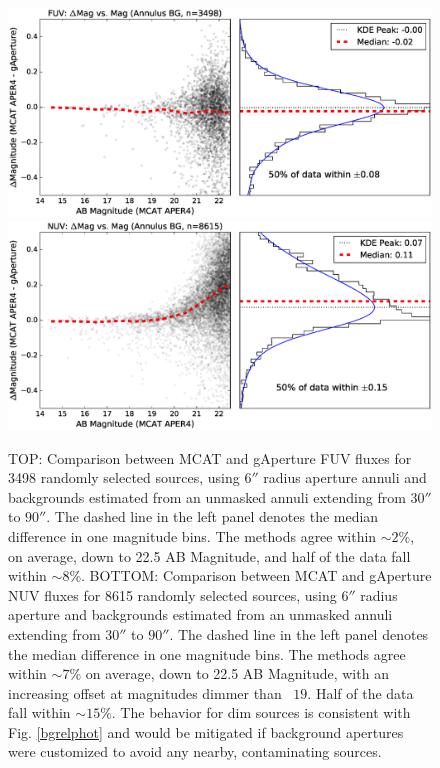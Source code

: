 \documentclass[preprint]{aastex}
\begin{document}
\begin{figure}[t!]
\begin{minipage}[c][11cm][c]{1.\textwidth}
\centering
\includegraphics[scale=0.64]{Fig05a.eps}
\includegraphics[scale=0.64]{Fig05b.eps}
\caption{TOP: Comparison between MCAT and gAperture FUV fluxes for 3498 randomly selected sources, using $6''$ radius aperture annuli and backgrounds estimated from an unmasked annuli extending from $30''$ to $90''$. The dashed line in the left panel denotes the median difference in one magnitude bins. The methods agree within $\sim 2$\%, on average, down to 22.5 AB Magnitude, and half of the data fall within $\sim 8$\%.  BOTTOM: Comparison between MCAT and gAperture NUV fluxes for 8615 randomly selected sources, using $6''$ radius aperture and backgrounds estimated from an unmasked annuli extending from $30''$ to $90''$. The dashed line in the left panel denotes the median difference in one magnitude bins. The methods agree within $\sim 7$\% on average, down to 22.5 AB Magnitude, with an increasing offset at magnitudes dimmer than ~$19$. Half of the data fall within $\sim 15$\%. The behavior for dim sources is consistent with Fig. \ref{bgrelphot} and would be mitigated if background apertures were customized to avoid any nearby, contaminating sources.
\label{fuvnuvrelphot}}
\end{minipage}
\end{figure}
\end{document}
